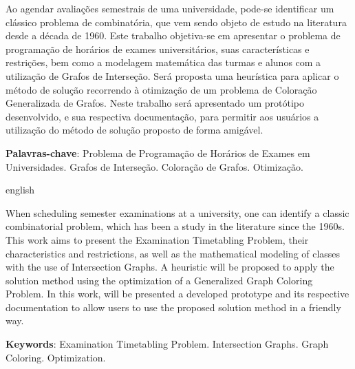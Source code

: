 
\setlength{\absparsep}{12pt} %
\begin{resumo}

Ao agendar avaliações semestrais de uma universidade, pode-se identificar um clássico problema de combinatória, que vem sendo objeto de estudo na literatura desde a década de 1960. Este trabalho objetiva-se em apresentar o problema de programação de horários de exames universitários, suas características e restrições, bem como a modelagem matemática das turmas e alunos com a utilização de Grafos de Interseção. Será proposta uma heurística para aplicar o método de solução recorrendo à otimização de um problema de Coloração Generalizada de Grafos. Neste trabalho será apresentado um protótipo desenvolvido, e sua respectiva documentação, para permitir aos usuários a utilização do método de solução proposto de forma amigável.

 \textbf{Palavras-chave}: Problema de Programação de Horários de Exames em Universidades. Grafos de Interseção. Coloração de Grafos. Otimização.

\end{resumo}

\begin{resumo}[Abstract]
 \begin{otherlanguage*}{english}
 
When scheduling semester examinations at a university, one can identify a classic combinatorial problem, which has been a study in the literature since the 1960s. This work aims to present the Examination Timetabling Problem, their characteristics and restrictions, as well as the mathematical modeling of classes with the use of Intersection Graphs. A heuristic will be proposed to apply the solution method using the optimization of a Generalized Graph Coloring Problem. In this work, will be presented a developed prototype and its respective documentation to allow users to use the proposed solution method in a friendly way.

   \vspace{\onelineskip}

\noindent
  \textbf{Keywords}:  Examination Timetabling Problem. Intersection Graphs. Graph Coloring. Optimization.
 \end{otherlanguage*}
\end{resumo}



%
